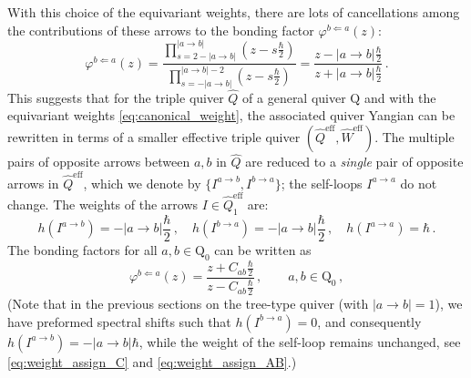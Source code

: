 \documentclass[12pt,a4paper]{article}
\renewcommand{\(}{\left(}
\renewcommand{\)}{\right)}
\renewcommand{\(}{\left(}
\renewcommand{\)}{\right)}
\begin{document}
With this choice of the equivariant weights, there are lots of  cancellations among the contributions of these arrows to the bonding factor $\varphi^{b\Leftarrow a}(z)$:
\begin{equation}\label{eq:BFtriple}
\varphi^{b\Leftarrow a}(z)=\frac{\prod_{s=2-|a\to b|}^{|a\to b|}(z-s\frac{\hbar}{2})}{\prod_{s=-|a\to b|}^{|a\to b|-2}(z-s\frac{\hbar}{2})}=\frac{z-|a\to b|\frac{\hbar}{2}}{z+|a\to b|\frac{\hbar}{2}}\,.
\end{equation}
This suggests that for the triple quiver $\widehat{Q}$ of a general quiver $\mathrm{Q}$ and with the equivariant weights \eqref{eq:canonical_weight}, the associated quiver Yangian can be rewritten in terms of a smaller effective triple quiver $(\widehat{Q}^{\text{eff}},\widehat{W}^{\text{eff}})$.
The multiple pairs of opposite arrows between $a,b$ in $\widehat{Q}$ are reduced to a \textit{single} pair of opposite arrows in $\widehat{Q}^{\text{eff}}$, which we denote by $\{I^{a\to b},I^{b\to a}\}$; the self-loops $I^{a\rightarrow a}$ do not change.
The weights of the arrows $I\in \widehat{Q}^{\text{eff}}_1$ are: 
\begin{equation}\label{eq:weightsEff}
h(I^{a\rightarrow b})=-|a\to b|\frac{\hbar}{2}
\,, \quad h(I^{b\rightarrow a})=-|a\to b|\frac{\hbar}{2}
\,,\quad
h({I^{a\to a}})=\hbar\,.
\end{equation}
The bonding factors for all $a,b\in\mathrm{Q}_0$ can be written 
 as \begin{equation}\label{eq:non-tree_bond}
\varphi^{b\Leftarrow a}(z)=\frac{z+C_{ab}\frac{\hbar}{2}}{z-C_{ab}\frac{\hbar}{2}}\,,\qquad a,b\in\mathrm{Q}_0\,,
\end{equation} 
(Note that in the previous sections on the tree-type quiver (with $|a\rightarrow b|=1$), we have preformed spectral shifts such that $h(I^{b\rightarrow a})=0$, and consequently $h(I^{a\rightarrow b})=-|a\to b|\hbar$, while the weight of the self-loop remains unchanged, see \eqref{eq:weight_assign_C} and \eqref{eq:weight_assign_AB}.)
\end{document}
